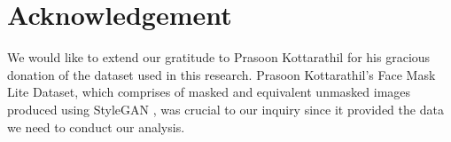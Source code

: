 \documentclass{36_styles/svproc}
\begin{document}
\section{Acknowledgement}
We would like to extend our gratitude to Prasoon Kottarathil for his gracious donation of the dataset used in this research. Prasoon Kottarathil's Face Mask Lite Dataset, which comprises of masked and equivalent unmasked images produced using StyleGAN \cite{karras2020analyzing}, was crucial to our inquiry since it provided the data we need to conduct our analysis.

\printbibliography
\end{document}
